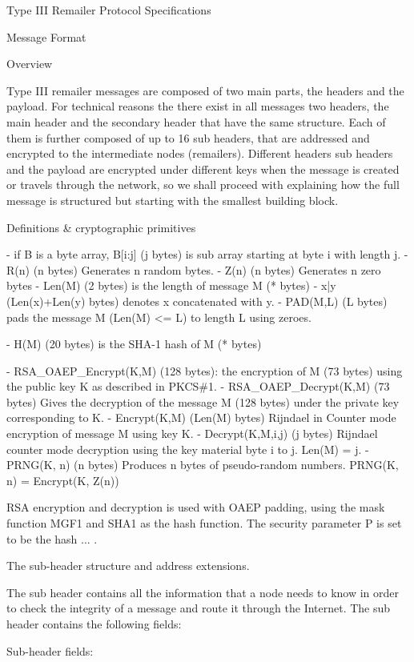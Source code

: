 Type III Remailer Protocol Specifications

Message Format

Overview 

Type III remailer messages are composed of two main parts, the
headers and the payload. For technical reasons the there exist in
all messages two headers, the main header and the secondary header
that have the same structure. Each of them is further composed of up
to 16 sub headers, that are addressed and encrypted to the
intermediate nodes (remailers). Different headers sub headers and the
payload are encrypted under different keys when the message is created
or travels through the network, so we shall proceed with explaining
how the full message is structured but starting with the smallest
building block. 

Definitions & cryptographic primitives

- if B is a byte array, B[i:j] (j bytes) is sub array starting at 
  byte i with length j.
- R(n) (n bytes) Generates n random bytes.
- Z(n) (n bytes) Generates n zero bytes
- Len(M) (2 bytes) is the length of message M (* bytes)
- x|y (Len(x)+Len(y) bytes) denotes x concatenated with y.
- PAD(M,L) (L bytes) pads the message M (Len(M) <= L) to length L
  using zeroes.

- H(M) (20 bytes) is the SHA-1 hash of M (* bytes)

- RSA_OAEP_Encrypt(K,M) (128 bytes): the encryption of M (73
  bytes) using the public key K as described in PKCS\#1.
- RSA_OAEP_Decrypt(K,M) (73 bytes) Gives the decryption of the
  message M (128 bytes) under the private key corresponding to K.
- Encrypt(K,M) (Len(M) bytes) Rijndael in Counter mode encryption 
  of message M using key K. 
- Decrypt(K,M,i,j) (j bytes) Rijndael counter mode decryption 
  using the key material byte i to j. Len(M) = j.
- PRNG(K, n) (n bytes) Produces n bytes of pseudo-random numbers.
  PRNG(K, n) = Encrypt(K, Z(n))

RSA encryption and decryption is used with OAEP padding, using the 
mask function MGF1 and SHA1 as the hash function. The security
parameter P is set to be the hash ... .

The sub-header structure and address extensions.

The sub header contains all the information that a node needs to know
in order to check the integrity of a message and route it through the
Internet. The sub header contains the following fields: 

Sub-header fields:

